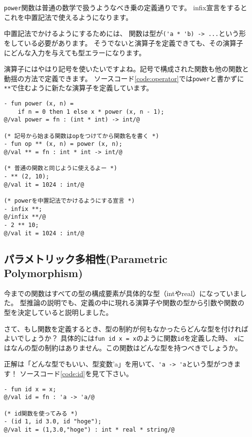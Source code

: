 \documentclass[11pt,a4paper]{article}
\begin{document}
\lstinline{power}関数は普通の数学で扱うようなべき乗の定義通りです。
infix宣言をするとこれを中置記法で使えるようになります。

中置記法でかけるようにするためには、
関数は型が\lstinline{('a * 'b) -> ...}という形をしている必要があります。
そうでないと演算子を定義できても、その演算子にどんな入力を与えても型エラーになります。

演算子にはやはり記号を使いたいですよね。記号で構成された関数も他の関数と動揺の方法で定義できます。
ソースコード\ref{code:operator}では\lstinline{power}と書かずに
\lstinline{**}で住むように新たな演算子を定義しています。

\begin{lstlisting}[caption=演算子の定義,label=code:operator]
- fun power (x, n) =
    if n = 0 then 1 else x * power (x, n - 1);
@/val power = fn : (int * int) -> int/@

(* 記号から始まる関数はopをつけてから関数名を書く *)
- fun op ** (x, n) = power (x, n);
@/val ** = fn : int * int -> int/@

(* 普通の関数と同じように使えるよー *)
- ** (2, 10);
@/val it = 1024 : int/@

(* powerを中置記法でかけるようにする宣言 *)
- infix **;
@/infix **/@
- 2 ** 10;
@/val it = 1024 : int/@
\end{lstlisting}
\subsection{パラメトリック多相性(Parametric Polymorphism)}

今までの関数はすべての型の構成要素が具体的な型（intやreal）になっていました。
型推論の説明でも、定義の中に現れる演算子や関数の型から引数や関数の型を決定していると説明しました。

さて、もし関数を定義するとき、型の制約が何もなかったらどんな型を付ければよいでしょうか？
具体的には\lstinline{fun id x = x}のように関数\lstinline{id}を定義した時、
\lstinline{x}にはなんの型の制約はありません。この関数はどんな型を持つべきでしょうか。

正解は「どんな型でもいい、型変数'a」を用いて、\lstinline{'a -> 'a}という型がつきます！
ソースコード\ref{code:id}を見て下さい。

\begin{lstlisting}[caption=多相関数,label=code:id]
- fun id x = x;
@/val id = fn : 'a -> 'a/@

(* id関数を使ってみる *)
- (id 1, id 3.0, id "hoge");
@/val it = (1,3.0,"hoge") : int * real * string/@
\end{lstlisting}
\end{document}

